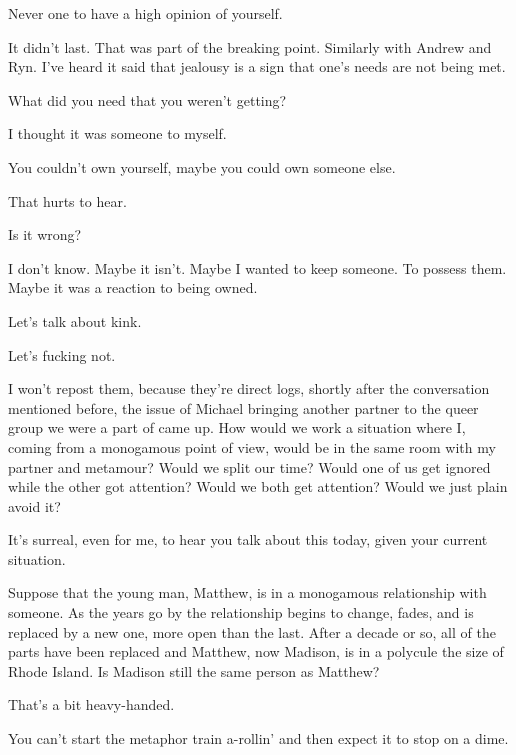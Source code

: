 \begin{paracol}{2}
\begin{leftcolumn}
\begin{ally}
Never one to have a high opinion of yourself.
\end{ally}
It didn't last. That was part of the breaking point. Similarly with Andrew and Ryn. I've heard it said that jealousy is a sign that one's needs are not being met.

\begin{ally}
What did you need that you weren't getting?
\end{ally}
I thought it was someone to myself.

\begin{ally}
You couldn't own yourself, maybe you could own someone else.
\end{ally}
That hurts to hear.

\begin{ally}
Is it wrong?
\end{ally}
I don't know. Maybe it isn't. Maybe I wanted to keep someone. To possess them. Maybe it was a reaction to being owned.

\begin{ally}
Let's talk about kink.
\end{ally}
Let's fucking not.
\newpage

\noindent I won't repost them, because they're direct logs, shortly after the conversation mentioned before, the issue of Michael bringing another partner to the queer group we were a part of came up. How would we work a situation where I, coming from a monogamous point of view, would be in the same room with my partner and metamour? Would we split our time? Would one of us get ignored while the other got attention? Would we both get attention? Would we just plain avoid it?

\begin{ally}
It's surreal, even for me, to hear you talk about this today, given your current situation.
\end{ally}
Suppose that the young man, Matthew, is in a monogamous relationship with someone. As the years go by the relationship begins to change, fades, and is replaced by a new one, more open than the last. After a decade or so, all of the parts have been replaced and Matthew, now Madison, is in a polycule the size of Rhode Island. Is Madison still the same person as Matthew?

\begin{ally}
That's a bit heavy-handed.
\end{ally}
You can't start the metaphor train a-rollin' and then expect it to stop on a dime.


\end{leftcolumn}
\end{paracol}
